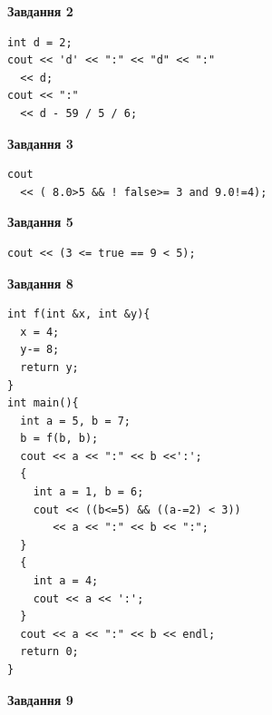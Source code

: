 \documentclass[12pt, ukrainian]{article}
\begin{document}
{\begin {large}
\begin{minipage}[t]{7.0cm}
\end{minipage}
\vline \hspace{1mm}
\begin{minipage}[t]{11.0cm}

\begin{center}
\textbf{Завдання 2}
\end{center}
\vspace{-8mm}

\begin{verbatim}
int d = 2;
cout << 'd' << ":" << "d" << ":" 
  << d;
cout << ":" 
  << d - 59 / 5 / 6;
\end{verbatim}



\begin{center}
\textbf{Завдання 3}
\end{center}
\vspace{-8mm}

\begin{verbatim}
cout 
  << ( 8.0>5 && ! false>= 3 and 9.0!=4);
\end{verbatim}



\begin{center}
\textbf{Завдання 5}
\end{center}
\vspace{-8mm}

\begin{verbatim}
cout << (3 <= true == 9 < 5);
\end{verbatim}



\begin{center}
\textbf{Завдання 8}
\end{center}
\vspace{-8mm}

\begin{verbatim}
int f(int &x, int &y){
  x = 4;
  y-= 8;
  return y;
}
int main(){
  int a = 5, b = 7;
  b = f(b, b);
  cout << a << ":" << b <<':';
  {
    int a = 1, b = 6;
    cout << ((b<=5) && ((a-=2) < 3))
       << a << ":" << b << ":";
  }
  {
    int a = 4;
    cout << a << ':';
  }
  cout << a << ":" << b << endl;
  return 0;
}
\end{verbatim}

\end{minipage}


\begin{minipage}[t]{7.0cm}

\begin{center}
\textbf{Завдання 9}
\end{center}
\vspace{-8mm}


\end{minipage}
\end{large}}
\end{document}
